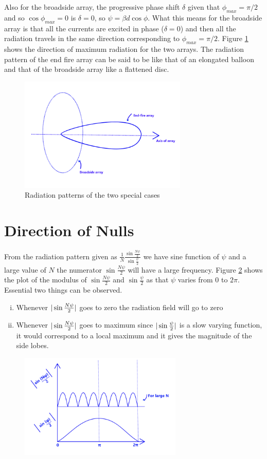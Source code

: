 Also for the broadside array, the progressive phase shift $\delta$ given that $\phi_{max} = \pi/2$ and so $\cos\phi_{max} = 0$ is $\delta = 0$, so $\psi = \beta d \cos{\phi}$. What this means for the broadside array is that all the currents are excited in phase ($\delta = 0$) and then all the radiation travels in the same direction corresponding to $\phi_{max} = \pi /2$. Figure \ref{53.2} shows the direction of maximum radiation for the two arrays. The radiation pattern of the end fire array can be said to be like that of an elongated balloon and that of the broadside array like a flattened disc.
\begin{figure}[h]
\centering
\includegraphics[width=8cm]{./graphics/fig53_2}
\caption{Radiation patterns of the two special cases}
\label{53.2}
\end{figure}

\section{Direction of Nulls}
From the radiation pattern given as $\frac{1}{N} \frac{\sin{\frac{N\psi}{2}}}{\sin{\frac{\psi}{2}}} $ we have sine function of $\psi$ and a large value of $N$ the numerator $\sin{\frac{N\psi}{2}} $ will have a large frequency. Figure \ref{53.3} shows the plot of the modulus of $\sin{\frac{N\psi}{2}}$ and $\sin{\frac{\psi}{2}}$ as that $\psi$ varies from $0$ to $2\pi$. Essential two things can be observed. 
\begin{enumerate}[(i)]
\item Whenever $\arrowvert \sin{\frac{N\psi}{2}} \arrowvert$ goes to zero the radiation field will go to zero 
\item Whenever $\arrowvert \sin{\frac{N\psi}{2}} \arrowvert$ goes to maximum since $\arrowvert \sin{\frac{\psi}{2}} \arrowvert$ is a slow varying function, it would correspond to a local maximum and it gives the magnitude of the side lobes.
\end{enumerate}
\begin{figure}[h]
\centering
\includegraphics[height=5cm]{./graphics/fig53_3}
\caption{}
\label{53.3}
\end{figure}


